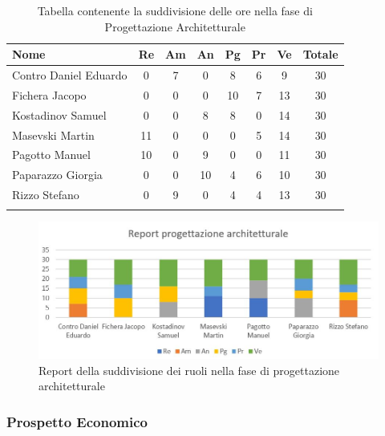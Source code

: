 \documentclass[../piano_di_progetto.tex]{subfiles}
\begin{document}
\begin{center}
	\begin{longtable}{|l|c|c|c|c|c|c|c|}
		\hline
		\rowcolor{lightgray}
		\textbf{Nome} & \textbf{Re} & \textbf{Am} & \textbf{An} & \textbf{Pg}  & \textbf{Pr}   & \textbf{Ve} & \textbf{Totale} \\

		\hline
			Contro Daniel Eduardo & 0 & 7 & 0 & 8 & 6 & 9 & 30\\
		\hline
			Fichera Jacopo & 0 & 0 & 0 & 10 & 7 & 13 & 30 \\
		\hline
			Kostadinov Samuel & 0 & 0 & 8 & 8 & 0 & 14 & 30 \\			
		\hline
			Masevski Martin 	& 11 & 0 & 0 & 0 & 5 & 14 & 30\\
		\hline
			Pagotto Manuel & 10 & 0 & 9 & 0 & 0 & 11 & 30 \\			
		\hline
			Paparazzo Giorgia & 0 & 0 & 10 & 4 & 6 & 10 & 30 \\
		\hline
			Rizzo Stefano & 0 & 9 & 0 & 4 & 4 & 13 & 30\\
		\hline	

		\caption{Tabella contenente la suddivisione delle ore nella fase di Progettazione Architetturale}
	\end{longtable}
\end{center}

\begin{figure}[H]
\centering
\includegraphics[width=12cm]{img/report_prog_arc}
\caption{Report della suddivisione dei ruoli nella fase di progettazione architetturale}
\end{figure}

\subsubsection{Prospetto Economico}
\end{document}
